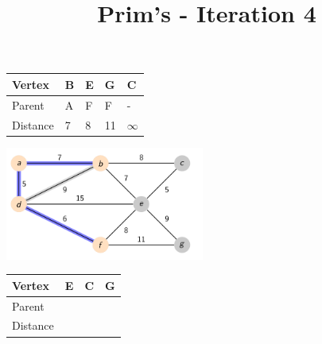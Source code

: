 \documentclass{beamer}
\begin{document}
\begin{frame}[fragile]
    \title{Prim's - Iteration 4}
    \centering
    \begin{table}[]
        \begin{tabular}{|l|l|l|l|l|}
            \hline
            Vertex   & B & E & G  & C        \\ \hline
            Parent   & A & F & F  & -        \\ \hline
            Distance & 7 & 8 & 11 & $\infty$ \\ \hline
        \end{tabular}
    \end{table}
    \includegraphics[width=0.49\textwidth]{./imgs/prims_walkthrough/prims4.png}
    \begin{table}[]
        \begin{tabular}{|l|l|l|l|}
            \hline
            Vertex   & E & C & G  \\ \hline
            Parent   &  &  &   \\ \hline
            Distance &  &  &  \\ \hline
        \end{tabular}
    \end{table}

\end{frame}
\end{document}
